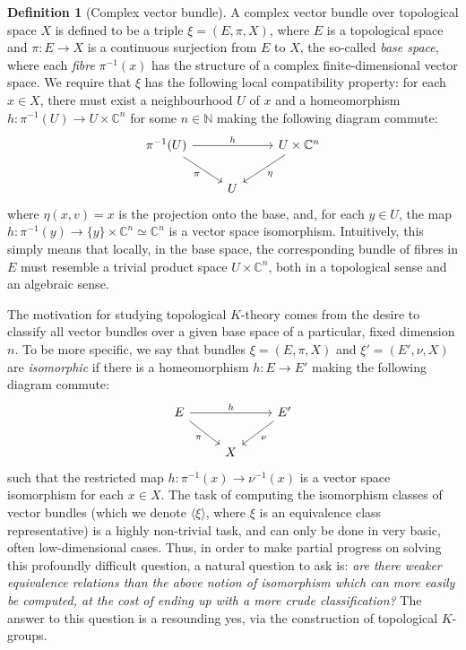 \documentclass[aps,pra,showpacs,notitlepage,onecolumn,superscriptaddress,nofootinbib]{revtex4-1}
\theoremstyle{definition}
\newtheorem{definition}{Definition}[section]
\begin{document}
\begin{definition}[Complex vector bundle]
  A complex vector bundle over topological space $X$ is defined to be a triple $\xi = (E, \pi, X)$, where $E$ is a topological space and $\pi : E \rightarrow X$ is a continuous surjection
  from $E$ to $X$, the so-called \emph{base space}, where each \emph{fibre} $\pi^{-1}(x)$ has the structure of a complex finite-dimensional vector space. We require that $\xi$ has the following
  local compatibility property: for each $x \in X$, there must exist a neighbourhood $U$ of $x$ and a homeomorphism $h : \pi^{-1}(U) \rightarrow U \times \mathbb{C}^n$ for some $n \in \mathbb{N}$
  making the following diagram commute:
  \[\begin{tikzcd}
	          {\pi^{-1}(U)} && {U \times \mathbb{C}^{n}} \\
	          & U
	          \arrow["h", from=1-1, to=1-3]
	          \arrow["\pi"', from=1-1, to=2-2]
	          \arrow["\eta", from=1-3, to=2-2]
  \end{tikzcd}\]
  where $\eta(x, v) = x$ is the projection onto the base, and, for each $y \in U$, the map $h : \pi^{-1}(y) \rightarrow \{y\} \times \mathbb{C}^n \simeq \mathbb{C}^n$ is a vector
  space isomorphism. Intuitively, this simply means that locally, in the base space, the corresponding bundle of fibres in $E$ must resemble a trivial product space $U \times \mathbb{C}^n$,
  both in a topological sense and an algebraic sense.
\end{definition}

\noindent The motivation for studying topological $K$-theory comes from the desire to classify all vector bundles over a given base space of a particular, fixed dimension $n$.
To be more specific, we say that bundles $\xi = (E, \pi, X)$ and $\xi' = (E', \nu, X)$ are \emph{isomorphic} if there is a homeomorphism $h : E \rightarrow E'$ making the following diagram commute:
\[\begin{tikzcd}
E && {E'} \\
& X
\arrow["h", from=1-1, to=1-3]
\arrow["\nu", from=1-3, to=2-2]
\arrow["\pi"', from=1-1, to=2-2]
\end{tikzcd}\]
such that the restricted map $h : \pi^{-1}(x) \rightarrow \nu^{-1}(x)$ is a vector space isomorphism for each $x \in X$. The task of computing the isomorphism classes
of vector bundles (which we denote $\langle \xi \rangle$, where $\xi$ is an equivalence class representative) is a highly non-trivial task, and can only be done in very basic, often low-dimensional cases.
Thus, in order to make partial progress on solving this profoundly difficult question, a natural question to ask is: \emph{are there weaker equivalence relations than the above notion of isomorphism which can more easily be computed, at the cost
of ending up with a more crude classification?} The answer to this question is a resounding yes, via the construction of topological $K$-groups.
\newline
\end{document}
